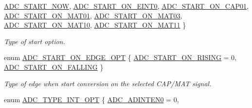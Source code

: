 \begin{DoxyCompactItemize}
\hyperlink{group___a_d_c___public___types_ggac6226b9af610bd4800b65ddfc93ee516a0a0386df411db0ce22aeebf763bdaa21}{\-A\-D\-C\-\_\-\-S\-T\-A\-R\-T\-\_\-\-N\-O\-W}, 
\hyperlink{group___a_d_c___public___types_ggac6226b9af610bd4800b65ddfc93ee516a8b2528c66233628acffe4cda93bf16f7}{\-A\-D\-C\-\_\-\-S\-T\-A\-R\-T\-\_\-\-O\-N\-\_\-\-E\-I\-N\-T0}, 
\hyperlink{group___a_d_c___public___types_ggac6226b9af610bd4800b65ddfc93ee516aca377a8aae1e21e4a0fdcde3362e7c0b}{\-A\-D\-C\-\_\-\-S\-T\-A\-R\-T\-\_\-\-O\-N\-\_\-\-C\-A\-P01}, 
\*
\hyperlink{group___a_d_c___public___types_ggac6226b9af610bd4800b65ddfc93ee516ac743dd82c64dc8e78e1cddc5f1d3ff7c}{\-A\-D\-C\-\_\-\-S\-T\-A\-R\-T\-\_\-\-O\-N\-\_\-\-M\-A\-T01}, 
\hyperlink{group___a_d_c___public___types_ggac6226b9af610bd4800b65ddfc93ee516abca1d03376d47790622e41fbdee37bdb}{\-A\-D\-C\-\_\-\-S\-T\-A\-R\-T\-\_\-\-O\-N\-\_\-\-M\-A\-T03}, 
\hyperlink{group___a_d_c___public___types_ggac6226b9af610bd4800b65ddfc93ee516ab89c287af37d98703eb71a853329fa7d}{\-A\-D\-C\-\_\-\-S\-T\-A\-R\-T\-\_\-\-O\-N\-\_\-\-M\-A\-T10}, 
\hyperlink{group___a_d_c___public___types_ggac6226b9af610bd4800b65ddfc93ee516a60213c70c0b3fd40c98ffa6aa2106391}{\-A\-D\-C\-\_\-\-S\-T\-A\-R\-T\-\_\-\-O\-N\-\_\-\-M\-A\-T11}
 \}
\begin{DoxyCompactList}\small\item\em \-Type of start option. \end{DoxyCompactList}\item 
enum \hyperlink{group___a_d_c___public___types_gaa9418cc298ccc8cf9631d9c0cfd6fdde}{\-A\-D\-C\-\_\-\-S\-T\-A\-R\-T\-\_\-\-O\-N\-\_\-\-E\-D\-G\-E\-\_\-\-O\-P\-T} \{ \hyperlink{group___a_d_c___public___types_ggaa9418cc298ccc8cf9631d9c0cfd6fddea83fc5534eeb9084bfa0c1d330612230d}{\-A\-D\-C\-\_\-\-S\-T\-A\-R\-T\-\_\-\-O\-N\-\_\-\-R\-I\-S\-I\-N\-G} =  0, 
\hyperlink{group___a_d_c___public___types_ggaa9418cc298ccc8cf9631d9c0cfd6fddea4077136f55b82e5a50684f4e4bc1fb74}{\-A\-D\-C\-\_\-\-S\-T\-A\-R\-T\-\_\-\-O\-N\-\_\-\-F\-A\-L\-L\-I\-N\-G}
 \}
\begin{DoxyCompactList}\small\item\em \-Type of edge when start conversion on the selected \-C\-A\-P/\-M\-A\-T signal. \end{DoxyCompactList}\item 
enum \hyperlink{group___a_d_c___public___types_gae7fc3523a8faf7363895609c07aba95b}{\-A\-D\-C\-\_\-\-T\-Y\-P\-E\-\_\-\-I\-N\-T\-\_\-\-O\-P\-T} \{ \*
\hyperlink{group___a_d_c___public___types_ggae7fc3523a8faf7363895609c07aba95ba897f238c02c957515aa6f47fcbab5c95}{\-A\-D\-C\-\_\-\-A\-D\-I\-N\-T\-E\-N0} =  0, 

\end{DoxyCompactItemize}
